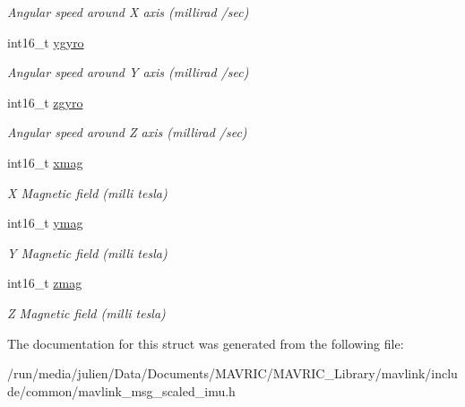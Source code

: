 \begin{DoxyCompactItemize}
\begin{DoxyCompactList}\small\item\em Angular speed around X axis (millirad /sec) \end{DoxyCompactList}\item 
\hypertarget{struct____mavlink__scaled__imu__t_a357d16590de8334390c67ddd5d3139b3}{int16\+\_\+t \hyperlink{struct____mavlink__scaled__imu__t_a357d16590de8334390c67ddd5d3139b3}{ygyro}}\label{struct____mavlink__scaled__imu__t_a357d16590de8334390c67ddd5d3139b3}

\begin{DoxyCompactList}\small\item\em Angular speed around Y axis (millirad /sec) \end{DoxyCompactList}\item 
\hypertarget{struct____mavlink__scaled__imu__t_a907db6388e441e51dc12ca89fa6c557b}{int16\+\_\+t \hyperlink{struct____mavlink__scaled__imu__t_a907db6388e441e51dc12ca89fa6c557b}{zgyro}}\label{struct____mavlink__scaled__imu__t_a907db6388e441e51dc12ca89fa6c557b}

\begin{DoxyCompactList}\small\item\em Angular speed around Z axis (millirad /sec) \end{DoxyCompactList}\item 
\hypertarget{struct____mavlink__scaled__imu__t_a600200625259b8ddc5702b2116e9d619}{int16\+\_\+t \hyperlink{struct____mavlink__scaled__imu__t_a600200625259b8ddc5702b2116e9d619}{xmag}}\label{struct____mavlink__scaled__imu__t_a600200625259b8ddc5702b2116e9d619}

\begin{DoxyCompactList}\small\item\em X Magnetic field (milli tesla) \end{DoxyCompactList}\item 
\hypertarget{struct____mavlink__scaled__imu__t_a9a17a611fe6ec9e3f5a384cb1708e0e9}{int16\+\_\+t \hyperlink{struct____mavlink__scaled__imu__t_a9a17a611fe6ec9e3f5a384cb1708e0e9}{ymag}}\label{struct____mavlink__scaled__imu__t_a9a17a611fe6ec9e3f5a384cb1708e0e9}

\begin{DoxyCompactList}\small\item\em Y Magnetic field (milli tesla) \end{DoxyCompactList}\item 
\hypertarget{struct____mavlink__scaled__imu__t_a10577e1d6e32fc231527134352ea9587}{int16\+\_\+t \hyperlink{struct____mavlink__scaled__imu__t_a10577e1d6e32fc231527134352ea9587}{zmag}}\label{struct____mavlink__scaled__imu__t_a10577e1d6e32fc231527134352ea9587}

\begin{DoxyCompactList}\small\item\em Z Magnetic field (milli tesla) \end{DoxyCompactList}\end{DoxyCompactItemize}


The documentation for this struct was generated from the following file\+:\begin{DoxyCompactItemize}
\item 
/run/media/julien/\+Data/\+Documents/\+M\+A\+V\+R\+I\+C/\+M\+A\+V\+R\+I\+C\+\_\+\+Library/mavlink/include/common/mavlink\+\_\+msg\+\_\+scaled\+\_\+imu.\+h\end{DoxyCompactItemize}
